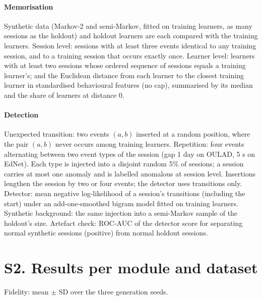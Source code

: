 \documentclass[11pt]{article}
\begin{document}
\paragraph{Memorisation} Synthetic data (Markov-2 and semi-Markov, fitted on
training learners, as many sessions as the holdout) and holdout learners are
each compared with the training learners. Session level: sessions with at
least three events identical to any training session, and to a training
session that occurs exactly once. Learner level: learners with at least two
sessions whose ordered sequence of sessions equals a training learner's; and
the Euclidean distance from each learner to the closest training learner in
standardised behavioural features (no cap), summarised by its median and the
share of learners at distance 0.

\paragraph{Detection} Unexpected transition: two events $(a, b)$ inserted at
a random position, where the pair $(a, b)$ never occurs among training
learners. Repetition: four events alternating between two event types of the
session (gap 1 day on OULAD, 5 s on EdNet). Each type is injected into a
disjoint random 5\% of sessions; a session carries at most one anomaly and
is labelled anomalous at session level. Insertions lengthen the session by
two or four events; the detector uses transitions only. Detector: mean
negative log-likelihood of a session's transitions (including the start) under
an add-one-smoothed bigram model fitted on training learners. Synthetic
background: the same injection into a semi-Markov sample of the holdout's
size. Artefact check: ROC-AUC of the detector score for separating normal
synthetic sessions (positive) from normal holdout sessions.

\section*{S2. Results per module and dataset}

Fidelity: mean $\pm$ SD over the three generation seeds.


\end{document}
